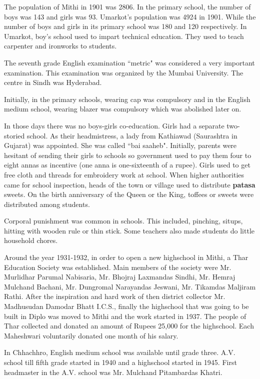 The population of Mithi in 1901 was 2806. In the primary school, the number of
boys was 143 and girls was 93. Umarkot's population was 4924 in 1901. While the
number of boys and girls in its primary school was 180 and 120 respectively. In
Umarkot, boy's school used to impart technical education. They used to teach
carpenter and ironworks to students. 

The seventh grade English examination ``metric" was considered a very important
examination. This examination was organized by the Mumbai University. The centre
in Sindh was Hyderabad.

Initially, in the primary schools, wearing cap was compulsory and in the English
medium school, wearing blazer was compulsory which was abolished later on.

In those days there was no boys-girls co-education. Girls had a separate
two-storied school. As their headmistress, a lady from Kathiawad (Saurashtra in
Gujarat) was appointed. She was called ``bai saaheb". Initially, parents were
hesitant of sending their girls to schools so government used to pay them four
to eight annas as incentive (one anna is one-sixteenth of a rupee). Girls used
to get free cloth and threads for embroidery work at school. When higher
authorities came for school inspection, heads of the town or village used to
distribute \textbf{patasa} sweets. On the birth anniversary of the Queen or the
King, toffees or sweets were distributed among students.

Corporal punishment was common in schools. This included, pinching, situps,
hitting with wooden rule or thin stick. Some teachers also made students do
little household chores.

Around the year 1931-1932, in order to open a new highschool in Mithi, a Thar
Education Society was established. Main members of the society were Mr.
Murlidhar Parumal Nabisaria, Mr. Bhojraj Laxmandas Sindhi, Mr. Hemraj Mulchand
Bachani, Mr. Dungromal Narayandas Jeswani, Mr. Tikamdas Maljiram Rathi. After
the inspiration and hard work of then district collector Mr. Madhusudan Damodar
Bhatt I.C.S., finally the highschool that was going to be built in Diplo was
moved to Mithi and the work started in 1937. The people of Thar collected and
donated an amount of Rupees 25,000 for the highschool. Each Maheshwari
voluntarily donated one month of his salary.

In Chhachhro, English medium school was available until grade three. A.V. school
till fifth grade started in 1940 and a highschool started in 1945. First
headmaster in the A.V. school was Mr. Mulchand Pitambardas Khatri.


